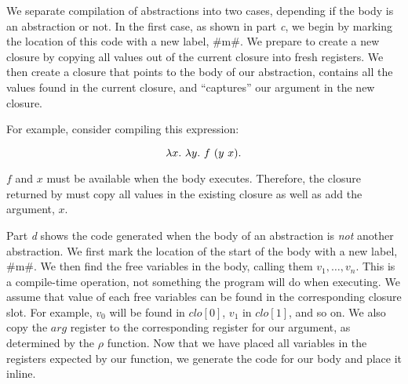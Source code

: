 \documentclass[12pt]{report}
\begin{document}
We separate compilation of abstractions into two cases, depending if
the body is an abstraction or not. In the first case, as shown in part
\emph{c}, we begin by marking the location of this code with a new label,
#m#. We prepare to create a new closure by copying all values out of
the current closure into fresh registers. We then create a closure that
points to the body of our abstraction, contains all the values found
in the current closure, and ``captures'' our argument in the new
closure. 

For example, consider compiling this expression:

\begin{equation}
  \lambda x.\ \lambda y.\ f\ (y\ x). 
\end{equation}

$f$ and $x$ must be available when the body
 executes. Therefore, the closure returned
by  must copy all values in the existing
closure as well as add the argument, $x$.

Part \emph{d} shows the code generated when the body of an abstraction
is \emph{not} another abstraction. We first mark the location of the
start of the body with a new label, #m#.  We then find the free
variables in the body, calling them $v_1, \dots, v_n$. This is a
compile-time operation, not something the program will do when
executing.  We assume that value of each free variables can be found
in the corresponding closure slot. For example, $v_0$ will be found in
$clo[0]$, $v_1$ in $clo[1]$, and so on. We also copy the $arg$
register to the corresponding register for our argument, as determined
by the $\rho$ function. Now that we have placed all variables in the
registers expected by our function, we generate the code for our body
and place it inline.







\end{document}

